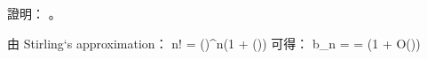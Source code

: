 \startitem
證明： 。
\stopitem

\startANSWER
由 Stirling‘s approximation：
\startformula
n! = \left(\right)^n\left(1 + \Theta()\right)
\stopformula
可得：
\startformula
b_n =  = (1 + O())
\stopformula
\stopANSWER

\stopigBase
\stopPROBLEM

\stopsubject%

